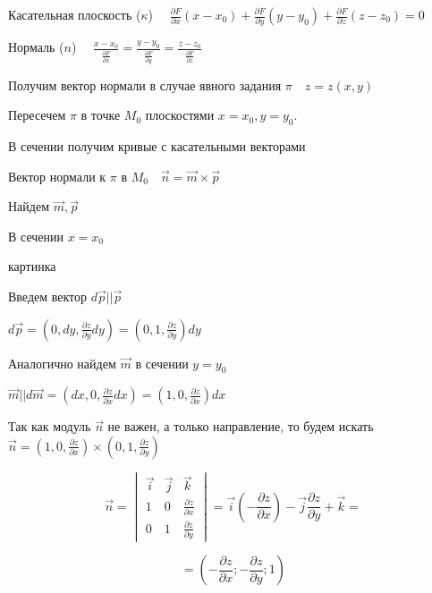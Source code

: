 \documentclass[12pt]{article}
\begin{document}
    Касательная плоскость ($\kappa$) $\quad \frac{\partial F}{\partial x} (x - x_0) + \frac{\partial F}{\partial y} (y - y_0) + \frac{\partial F}{\partial z} (z - z_0) = 0$

    Нормаль ($n$) $\quad \frac{x - x_0}{\frac{\partial F}{\partial x}} = \frac{y - y_0}{\frac{\partial F}{\partial y}} = \frac{z - z_0}{\frac{\partial F}{\partial z}}$

    \Nota Получим вектор нормали в случае явного задания $\pi \quad z = z(x, y)$

    Пересечем $\pi$ в точке $M_0$ плоскостями $x = x_0, y = y_0$.

    В сечении получим кривые с касательными векторами

    Вектор нормали к $\pi$ в $M_0 \quad \overrightarrow{n} = \overrightarrow{m} \times \overrightarrow{p}$

    Найдем $\overrightarrow{m}, \overrightarrow{p}$

    В сечении $x = x_0$

    картинка

    Введем вектор $d\overrightarrow{p} || \overrightarrow{p}$

    $d\overrightarrow{p} = \left(0, dy, \frac{\partial z}{\partial y}dy\right) = \left(0, 1, \frac{\partial z}{\partial y}\right) dy$

    Аналогично найдем $\overrightarrow{m}$ в сечении $y = y_0$

    $\overrightarrow{m} || d\overrightarrow{m} = \left(dx, 0, \frac{\partial z}{\partial x}dx\right) = \left(1, 0, \frac{\partial z}{\partial x}\right) dx$

    Так как модуль $\overrightarrow{n}$ не важен, а только направление, то будем искать
    $\overrightarrow{n} = \left(1, 0, \frac{\partial z}{\partial x}\right) \times \left(0, 1, \frac{\partial z}{\partial y}\right)$

    \[\overrightarrow{n} =
    \begin{vmatrix} \overrightarrow{i} & \overrightarrow{j} & \overrightarrow{k} \\
        1 & 0 & \frac{\partial z}{\partial x} \\ 0 & 1 & \frac{\partial z}{\partial y}
    \end{vmatrix} = \overrightarrow{i} \left(-\frac{\partial z}{\partial x}\right) - \overrightarrow{j} \frac{\partial z}{\partial y} + \overrightarrow{k} = \]

    \[= \left(-\frac{\partial z}{\partial x}; -\frac{\partial z}{\partial y}; 1\right)\]
\end{document}
